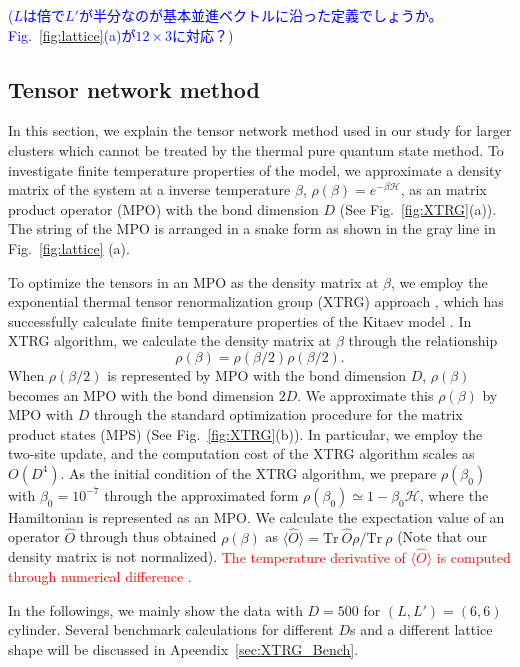 \documentclass[reprint,amsmath,amssymb,aps,prx]{revtex4-2}
\newcommand{\red}[1]{\textcolor{red}{#1}}
\newcommand{\blue}[1]{\textcolor{blue}{#1}}
\begin{document}
\blue{($L$は倍で$L'$が半分なのが基本並進ベクトルに沿った定義でしょうか。Fig.~\ref{fig:lattice}(a)が$12\times 3$に対応？)}

  \subsection{Tensor network method}
  In this section, we explain the tensor network method used in our study for larger clusters which cannot be treated by the thermal pure quantum state method. To investigate finite temperature properties of the model, we approximate a density matrix of the system at a inverse temperature $\beta$, $\rho(\beta) = e^{-\beta\mathcal{H}}$, as an matrix product operator (MPO) with the bond dimension $D$ (See Fig.~\ref{fig:XTRG}(a)). The string of the MPO is arranged in a snake form as shown in the gray line in Fig.~\ref{fig:lattice} (a). 

  To optimize the tensors in an MPO as the density matrix at $\beta$, we employ the exponential thermal tensor renormalization group (XTRG) approach \cite{Chen2018,Li2020}, which has successfully calculate finite temperature properties of the Kitaev model \cite{Li2020}. In XTRG algorithm, we calculate the density matrix at $\beta$ through the relationship
\begin{equation}
 \rho(\beta)=\rho(\beta/2)\rho(\beta/2).
\end{equation}
When $\rho(\beta/2)$ is represented by MPO with the bond dimension $D$, $\rho(\beta)$ becomes an MPO with the bond dimension $2D$. We approximate this $\rho(\beta)$ by MPO with $D$ through the standard optimization procedure for the matrix product states (MPS) \cite{Chen2018}  (See Fig.~\ref{fig:XTRG}(b)). In particular, we employ the two-site update, and the computation cost of the XTRG algorithm scales as $O(D^4)$. As the initial condition of the XTRG algorithm, we prepare $\rho(\beta_0)$ with $\beta_0 = 10^{-7}$ through the approximated form $\rho(\beta_0) \simeq 1 - \beta_0\mathcal{H}$, where the Hamiltonian is represented as an MPO. We calculate the expectation value of an operator $\hat{O}$ through thus obtained $\rho(\beta)$ as $\langle \hat{O} \rangle = \mathrm{Tr}~\hat{O}\rho /\mathrm{Tr}~\rho$ (Note that our density matrix is not normalized). \red{The temperature derivative of $\langle \hat{O} \rangle$ is computed through numerical difference \cite{Chen2018}.}

In the followings, we mainly show the data with $D=500$ for $(L, L') = (6, 6)$ cylinder. Several benchmark calculations for different $D$s and a different lattice shape will be discussed in Apeendix~\ref{sec:XTRG_Bench}. 
\end{document}
